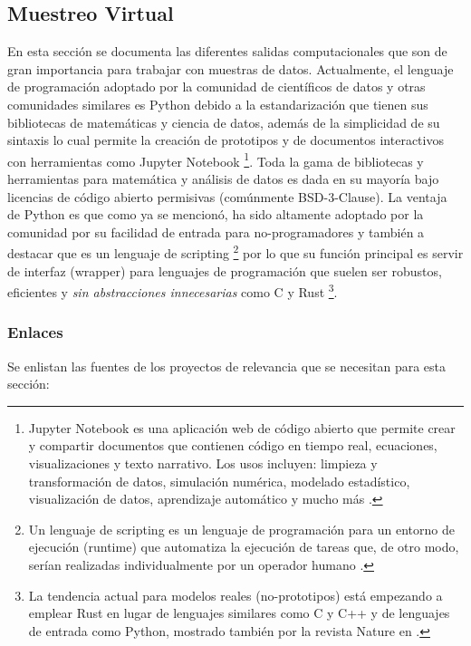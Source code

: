 \documentclass[conference]{IEEEtran}
\begin{document}
\subsection{Muestreo Virtual}

En esta sección se documenta las diferentes salidas computacionales que son de gran importancia para trabajar con muestras de datos. Actualmente, el lenguaje de programación adoptado por la comunidad de científicos de datos y otras comunidades similares es Python debido a la estandarización que tienen sus bibliotecas de matemáticas y ciencia de datos, además de la simplicidad de su sintaxis lo cual permite la creación de prototipos y de documentos interactivos con herramientas como Jupyter Notebook \footnote{Jupyter Notebook es una aplicación web de código abierto que permite crear y compartir documentos que contienen código en tiempo real, ecuaciones, visualizaciones y texto narrativo. Los usos incluyen: limpieza y transformación de datos, simulación numérica, modelado estadístico, visualización de datos, aprendizaje automático y mucho más \cite{jupyter-2021}.}. Toda la gama de bibliotecas y herramientas para matemática y análisis de datos es dada en su mayoría bajo licencias de código abierto permisivas (comúnmente BSD-3-Clause). La ventaja de Python es que como ya se mencionó, ha sido altamente adoptado por la comunidad por su facilidad de entrada para no-programadores y también a destacar que es un lenguaje de scripting \footnote{Un lenguaje de scripting es un lenguaje de programación para un entorno de ejecución (runtime) que automatiza la ejecución de tareas que, de otro modo, serían realizadas individualmente por un operador humano \cite{wikipedia-scripting-2021B}.} por lo que su función principal es servir de interfaz (wrapper) para lenguajes de programación que suelen ser robustos, eficientes y \textit{sin abstracciones innecesarias} como C y Rust \footnote{La tendencia actual para modelos reales (no-prototipos) está empezando a emplear Rust en lugar de lenguajes similares como C y C++ y de lenguajes de entrada como Python, mostrado también por la revista Nature en  \cite{nature-editorial-2020}.}.

\subsubsection{Enlaces}

Se enlistan las fuentes de los proyectos de relevancia que se necesitan para esta sección:
\end{document}
